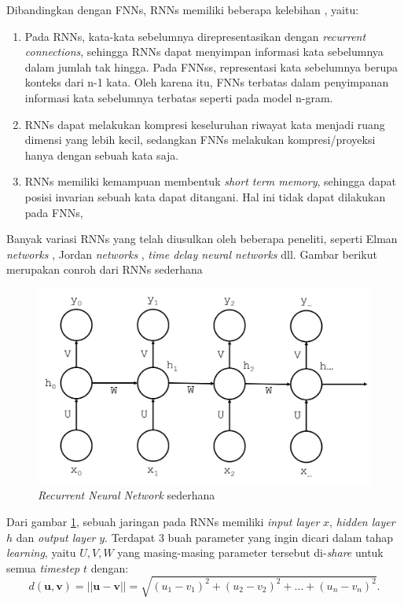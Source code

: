 Dibandingkan dengan FNNs, RNNs memiliki beberapa kelebihan \citep{mikolov2010recurrent}, yaitu:
\begin{enumerate}
	\item Pada RNNs, kata-kata sebelumnya direpresentasikan dengan \textit{recurrent connections}, sehingga RNNs dapat menyimpan informasi kata sebelumnya dalam jumlah tak hingga. Pada FNNss, representasi kata sebelumnya berupa konteks dari n-1 kata. Oleh karena itu, FNNs terbatas dalam penyimpanan informasi kata sebelumnya terbatas seperti pada model n-gram.
	\item RNNs dapat melakukan kompresi keseluruhan riwayat kata menjadi ruang dimensi yang lebih kecil, sedangkan FNNs melakukan kompresi/proyeksi hanya dengan sebuah kata saja.
	\item RNNs memiliki kemampuan membentuk \textit{short term memory}, sehingga dapat posisi invarian sebuah kata dapat ditangani. Hal ini tidak dapat dilakukan pada FNNs,
\end{enumerate}

Banyak variasi RNNs yang telah diusulkan oleh beberapa peneliti, seperti Elman \textit{networks} \citep{elman1990finding}, Jordan \textit{networks} \citep{jordan1986attractor}, \textit{time delay neural networks} \citep{lang1990time} dll. Gambar berikut merupakan conroh  dari RNNs sederhana

\begin{figure}
	\centering
	\includegraphics[width=0.80\linewidth]{images/simple_rnn}
	\caption{\textit{Recurrent Neural Network} sederhana}
	\label{fig:simple_rnn}
\end{figure}

Dari gambar \ref{fig:simple_rnn}, sebuah jaringan pada RNNs memiliki \textit{input layer} $ x $, \textit{hidden layer} $ h $ dan \textit{output layer} $ y $. Terdapat 3 buah parameter yang ingin dicari dalam tahap \textit{learning}, yaitu $ {U, V, W} $ yang masing-masing parameter tersebut di-\textit{share} untuk semua \textit{timestep} $ t $ dengan:
\begin{equation}\label{equ:euclideandistance}
d(\mathbf{u},\mathbf{v})=||\mathbf{u}-\mathbf{v}||=\sqrt{(u_1-v_1)^2+(u_2-v_2)^2+\dots+(u_n-v_n)^2}.
\end{equation}



